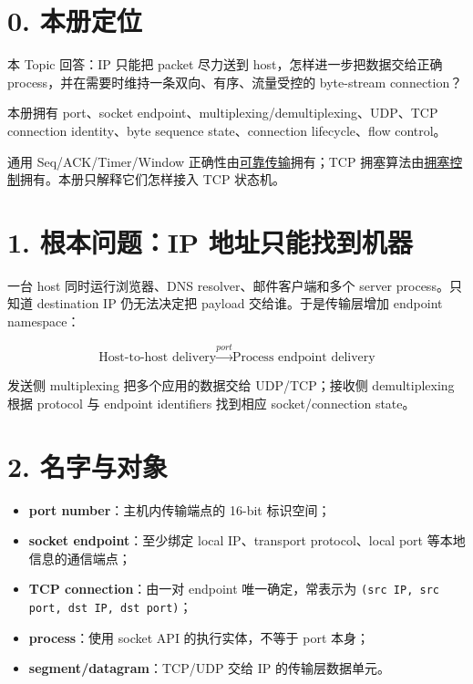 \documentclass[UTF8,fontset=none,11pt,a4paper]{ctexart}
\providecommand{\tightlist}{\setlength{\itemsep}{0pt}\setlength{\parskip}{0pt}}
\providecommand{\passthrough}[1]{#1}
\begin{document}
\section{0. 本册定位}\label{0-ux672cux518cux5b9aux4f4d}

本 Topic 回答：IP 只能把 packet 尽力送到 host，怎样进一步把数据交给正确
process，并在需要时维持一条双向、有序、流量受控的 byte-stream
connection？

本册拥有 port、socket endpoint、multiplexing/demultiplexing、UDP、TCP
connection identity、byte sequence state、connection lifecycle、flow
control。

通用 Seq/ACK/Timer/Window
正确性由\href{../03_可靠传输_序号_ACK_定时器与滑动窗口/README.md}{可靠传输}拥有；TCP
拥塞算法由\href{../07_拥塞_共享资源与反馈控制/README.md}{拥塞控制}拥有。本册只解释它们怎样接入
TCP 状态机。

\section{1. 根本问题：IP
地址只能找到机器}\label{1-ux6839ux672cux95eeux9898ip-ux5730ux5740ux53eaux80fdux627eux5230ux673aux5668}

一台 host 同时运行浏览器、DNS resolver、邮件客户端和多个 server
process。只知道 destination IP 仍无法决定把 payload
交给谁。于是传输层增加 endpoint namespace：

\[
\boxed{
\text{Host-to-host delivery}
\xrightarrow{port}
\text{Process endpoint delivery}
}
\]

发送侧 multiplexing 把多个应用的数据交给 UDP/TCP；接收侧 demultiplexing
根据 protocol 与 endpoint identifiers 找到相应 socket/connection state。

\section{2. 名字与对象}\label{2-ux540dux5b57ux4e0eux5bf9ux8c61}

\begin{itemize}
\tightlist
\item
  \textbf{port number}：主机内传输端点的 16-bit 标识空间；
\item
  \textbf{socket endpoint}：至少绑定 local IP、transport protocol、local
  port 等本地信息的通信端点；
\item
  \textbf{TCP connection}：由一对 endpoint 唯一确定，常表示为
  \passthrough{\lstinline!(src IP, src port, dst IP, dst port)!}；
\item
  \textbf{process}：使用 socket API 的执行实体，不等于 port 本身；
\item
  \textbf{segment/datagram}：TCP/UDP 交给 IP 的传输层数据单元。
\end{itemize}
\end{document}
